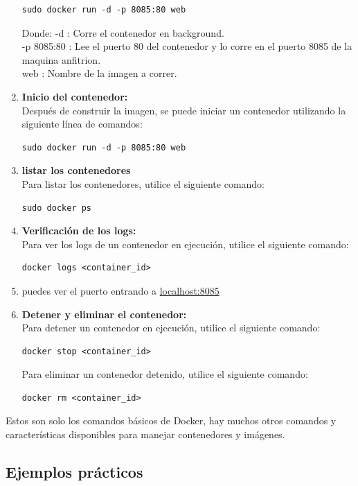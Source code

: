 \documentclass{article}
\begin{document}
\begin{enumerate}
    \begin{lstlisting}[numbers=none]
    sudo docker run -d -p 8085:80 web\end{lstlisting}
    Donde:
    -d : Corre el contenedor en background.\\
    -p 8085:80 : Lee el puerto 80 del contenedor y lo corre en el puerto 8085 de la maquina anfitrion.\\
    web : Nombre de la imagen a correr.
    \item \textbf{Inicio del contenedor:}\\ 
    Después de construir la imagen, se puede iniciar un contenedor utilizando la siguiente línea de comandos:
    \begin{lstlisting}[numbers=none]
    sudo docker run -d -p 8085:80 web\end{lstlisting}
    \item \textbf{listar los contenedores}\\ 
    Para listar los contenedores, utilice el siguiente comando:
    \begin{lstlisting}[numbers=none]
    sudo docker ps\end{lstlisting}
    \item \textbf{Verificación de los logs:}\\
    Para ver los logs de un contenedor en ejecución, utilice el siguiente comando:
    \begin{lstlisting}[numbers=none]
    docker logs <container_id>\end{lstlisting}
    \item puedes ver el puerto entrando a \href{http://localhost:8085/}{localhost:8085}
    \item \textbf{Detener y eliminar el contenedor:}\\ 
    Para detener un contenedor en ejecución, utilice el siguiente comando:
    \begin{lstlisting}[numbers=none]
    docker stop <container_id>\end{lstlisting}
    Para eliminar un contenedor detenido, utilice el siguiente comando:
    \begin{lstlisting}[numbers=none]
    docker rm <container_id>\end{lstlisting}
\end{enumerate}
Estos son solo los comandos básicos de Docker, hay muchos otros comandos y características disponibles para manejar contenedores y imágenes.\\
\subsection{Ejemplos prácticos}
\end{document}
